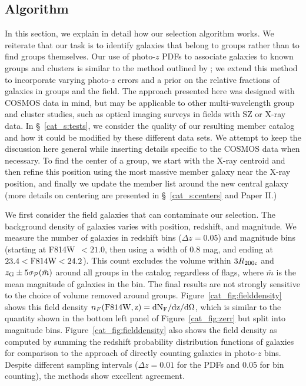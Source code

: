 \subsection{Algorithm}
 
In this section, we explain in detail how our selection algorithm
works. We reiterate that our task is to identify galaxies that belong
to groups rather than to find groups themselves. Our use of photo-$z$
PDFs to associate galaxies to known groups and clusters is similar to
the method outlined by \citet{Brunner2000}; we extend this method to
incorporate varying photo-$z$ errors and a prior on the relative
fractions of galaxies in groups and the field. The approach presented
here was designed with COSMOS data in mind, but may be applicable to
other multi-wavelength group and cluster studies, such as optical
imaging surveys in fields with SZ or X-ray data. In
\S~\ref{cat_s:tests}, we consider the quality of our resulting member
catalog and how it could be modified by these different data sets. We
attempt to keep the discussion here general while inserting details
specific to the COSMOS data when necessary. To find the center of a group, we
start with the X-ray centroid and then refine this position using
the most massive member galaxy near the X-ray position, and finally we
update the member list around the new central galaxy (more details on centering are
presented in \S~\ref{cat_s:centers} and Paper II.)

We first consider the field galaxies that can contaminate our selection.
The background density of galaxies varies with position, redshift, and
magnitude. We measure the number of galaxies in redshift bins
($\Delta z=0.05$) and magnitude bins (starting at F814W~$<21.0$, then
using a width of 0.8 mag, and ending at $23.4<\rm{F814W}<24.2$). This count excludes
the volume within $3\mbox{$R_{200\rm{c}}$}{}$ and $z_{\rm{G}}\pm 5\sigma_{\mathcal{P}}(\bar{m})$
around all groups in the catalog regardless of flags,
where $\bar{m}$ is the mean magnitude of galaxies in the bin. The
final results are not strongly sensitive to the choice of volume removed around
groups. Figure~\ref{cat_fig:fielddensity} shows this field density
$n_F(\rm{F814W},z)=dN_F/dz/d\Omega$, which is similar to the quantity
shown in the bottom left panel of Figure~\ref{cat_fig:zerr} but split
into magnitude bins. Figure~\ref{cat_fig:fielddensity} also shows the
field density as computed by summing the redshift probability
distribution functions of galaxies for comparison to the approach of
directly counting galaxies in photo-$z$ bins. Despite different sampling
intervals ($\Delta z=0.01$ for the PDFs and 0.05 for bin counting),
the methods show excellent agreement.

